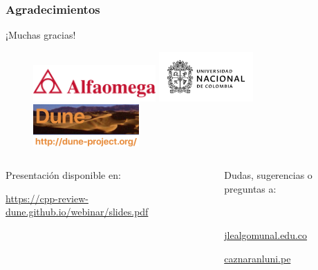 \begin{frame}
	\frametitle{Agradecimientos}
	\begin{center}\LARGE
		¡Muchas gracias!
	\end{center}
	\begin{figure}[ht!]
		\centering
		\includegraphics[height=1.4cm]{alfaomega}\quad
		\includegraphics[height=1.9cm]{unal}\quad
		\includegraphics[height=1.6cm]{dune-logo}
	\end{figure}
	\vfill
	\begin{columns}
		\begin{column}{0.5\textwidth}
			\textcolor{c++reviewduneblue}{Presentación disponible en:}
			\begin{center}
				\href{https://cpp-review-dune.github.io/webinar/slides.pdf}{\url{https://cpp-review-dune.github.io/webinar/slides.pdf}}
			\end{center}
		\end{column}
		\hfill
		\begin{column}{0.5\textwidth}
			\begin{flushright}
				Dudas, sugerencias o preguntas a:

				\

				\href{mailto:jlealgom@unal.edu.co}{jlealgom\MVAt unal.edu.co}

				\href{mailto:caznaranl@uni.pe}{caznaranl\MVAt uni.pe}
			\end{flushright}
		\end{column}
	\end{columns}

\end{frame}